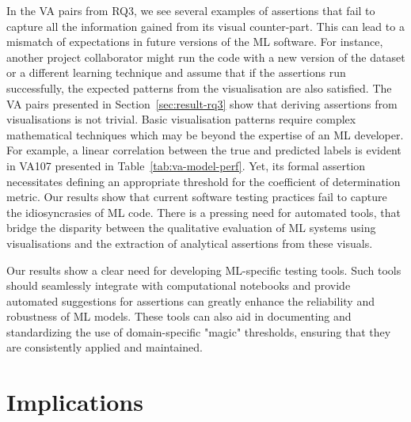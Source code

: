 In the VA pairs from RQ3, we see several examples of assertions that fail to capture all the information gained from its visual counter-part. This can lead to a mismatch of expectations in future versions of the ML software. For instance, another project collaborator might run the code with a new version of the dataset or a different learning technique and assume that if the assertions run successfully, the expected patterns from the visualisation are also satisfied. The VA pairs presented in Section~\ref{sec:result-rq3} show that deriving assertions from visualisations is not trivial. Basic visualisation patterns require complex mathematical techniques which may be beyond the expertise of an ML developer. For example, a linear correlation between the true and predicted labels is evident in VA107 presented in Table~\ref{tab:va-model-perf}. Yet, its formal assertion necessitates defining an appropriate threshold for the coefficient of determination metric. Our results show that current software testing practices fail to capture the idiosyncrasies of ML code. There is a pressing need for automated tools, that bridge the disparity between the qualitative evaluation of ML systems using visualisations and the extraction of analytical assertions from these visuals.

Our results show a clear need for developing ML-specific testing tools. Such tools should seamlessly integrate with computational notebooks and provide automated suggestions for assertions can greatly enhance the reliability and robustness of ML models. These tools can also aid in documenting and standardizing the use of domain-specific "magic" thresholds, ensuring that they are consistently applied and maintained.





\section{Implications}

